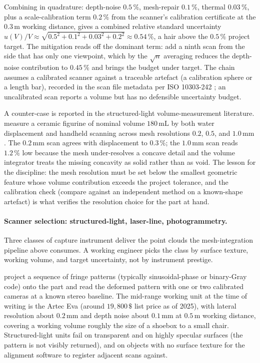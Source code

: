 Combining in quadrature: depth-noise $0.5\,\%$, mesh-repair
$0.1\,\%$, thermal $0.03\,\%$, plus a scale-calibration term
$0.2\,\%$ from the scanner's calibration certificate at the
$0.3 \,\si{\meter}$ working distance, gives a combined relative
standard uncertainty $u(V)/V \approx
\sqrt{0.5^{2} + 0.1^{2} + 0.03^{2} + 0.2^{2}} \approx 0.54\,\%$, a
hair above the $0.5\,\%$ project target. The mitigation reads off
the dominant term: add a ninth scan from the side that has only one
viewpoint, which by the $\sqrt{n}$ averaging reduces the depth-noise
contribution to $0.45\,\%$ and brings the budget under target. The
chain assumes a calibrated scanner against a traceable artefact (a
calibration sphere or a length bar), recorded in the scan file
metadata per ISO 10303-242
\cite{ch07-std:iso-iec-10303-242}; an uncalibrated scan reports a
volume but has no defensible uncertainty budget.

A counter-case is reported in the structured-light volume-measurement
literature. \cite{ch07-paper:zhang-3dscan-volume-2021} measure a
ceramic figurine of nominal volume $180 \,\si{\milli\liter}$ by both
water displacement and handheld scanning across mesh resolutions
$0.2$, $0.5$, and $1.0 \,\si{\milli\meter}$. The $0.2 \,\si{\milli
\meter}$ scan agrees with displacement to $0.3\,\%$; the $1.0 \,\si
{\milli\meter}$ scan reads $1.2\,\%$ low because the mesh
under-resolves a concave detail and the volume integrator treats the
missing concavity as solid rather than as void. The lesson for the
discipline: the mesh resolution must be set below the smallest
geometric feature whose volume contribution exceeds the project
tolerance, and the calibration check (compare against an independent
method on a known-shape artefact) is what verifies the resolution
choice for the part at hand.

\paragraph{Scanner selection: structured-light, laser-line,
photogrammetry.}
Three classes of capture instrument deliver the point clouds the
mesh-integration pipeline above consumes. A working engineer picks
the class by surface texture, working volume, and target
uncertainty, not by instrument prestige.

 project a sequence of fringe
patterns (typically sinusoidal-phase or binary-Gray code) onto the
part and read the deformed pattern with one or two calibrated
cameras at a known stereo baseline. The mid-range working unit at
the time of writing is the Artec Eva (around $19{,}800 \,\$ $ list
price as of 2025), with lateral resolution about $0.2 \,\si{\milli
\meter}$ and depth noise about $0.1 \,\si{\milli\meter}$ at
$0.5 \,\si{\meter}$ working distance, covering a working volume
roughly the size of a shoebox to a small chair. Structured-light
units fail on transparent and on highly specular surfaces (the
pattern is not visibly returned), and on objects with no surface
texture for the alignment software to register adjacent scans
against.


